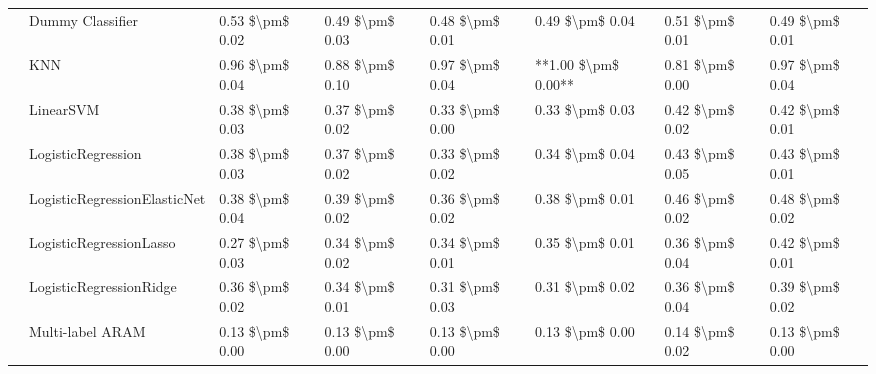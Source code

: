 \begin{tabular}{llllllll}
   & Dummy Classifier &      0.53 \$\textbackslash pm\$ 0.02 &           0.49 \$\textbackslash pm\$ 0.03 &       0.48 \$\textbackslash pm\$ 0.01 &        0.49 \$\textbackslash pm\$ 0.04 &                         0.51 \$\textbackslash pm\$ 0.01 &      0.49 \$\textbackslash pm\$ 0.01 \\
   & KNN &      0.96 \$\textbackslash pm\$ 0.04 &           0.88 \$\textbackslash pm\$ 0.10 &       0.97 \$\textbackslash pm\$ 0.04 &    **1.00 \$\textbackslash pm\$ 0.00** &                         0.81 \$\textbackslash pm\$ 0.00 &      0.97 \$\textbackslash pm\$ 0.04 \\
   & LinearSVM &      0.38 \$\textbackslash pm\$ 0.03 &           0.37 \$\textbackslash pm\$ 0.02 &       0.33 \$\textbackslash pm\$ 0.00 &        0.33 \$\textbackslash pm\$ 0.03 &                         0.42 \$\textbackslash pm\$ 0.02 &      0.42 \$\textbackslash pm\$ 0.01 \\
   & LogisticRegression &      0.38 \$\textbackslash pm\$ 0.03 &           0.37 \$\textbackslash pm\$ 0.02 &       0.33 \$\textbackslash pm\$ 0.02 &        0.34 \$\textbackslash pm\$ 0.04 &                         0.43 \$\textbackslash pm\$ 0.05 &      0.43 \$\textbackslash pm\$ 0.01 \\
   & LogisticRegressionElasticNet &      0.38 \$\textbackslash pm\$ 0.04 &           0.39 \$\textbackslash pm\$ 0.02 &       0.36 \$\textbackslash pm\$ 0.02 &        0.38 \$\textbackslash pm\$ 0.01 &                         0.46 \$\textbackslash pm\$ 0.02 &      0.48 \$\textbackslash pm\$ 0.02 \\
   & LogisticRegressionLasso &      0.27 \$\textbackslash pm\$ 0.03 &           0.34 \$\textbackslash pm\$ 0.02 &       0.34 \$\textbackslash pm\$ 0.01 &        0.35 \$\textbackslash pm\$ 0.01 &                         0.36 \$\textbackslash pm\$ 0.04 &      0.42 \$\textbackslash pm\$ 0.01 \\
   & LogisticRegressionRidge &      0.36 \$\textbackslash pm\$ 0.02 &           0.34 \$\textbackslash pm\$ 0.01 &       0.31 \$\textbackslash pm\$ 0.03 &        0.31 \$\textbackslash pm\$ 0.02 &                         0.36 \$\textbackslash pm\$ 0.04 &      0.39 \$\textbackslash pm\$ 0.02 \\
   & Multi-label ARAM &      0.13 \$\textbackslash pm\$ 0.00 &           0.13 \$\textbackslash pm\$ 0.00 &       0.13 \$\textbackslash pm\$ 0.00 &        0.13 \$\textbackslash pm\$ 0.00 &                         0.14 \$\textbackslash pm\$ 0.02 &      0.13 \$\textbackslash pm\$ 0.00 \\

\end{tabular}
